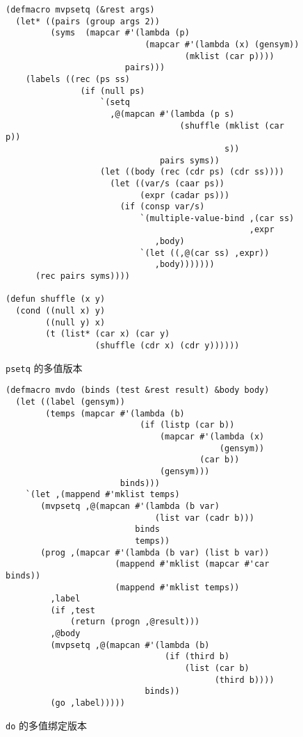 \begin{figure}
\begin{lstlisting}
(defmacro mvpsetq (&rest args)
  (let* ((pairs (group args 2))
         (syms  (mapcar #'(lambda (p)
                            (mapcar #'(lambda (x) (gensym))
                                    (mklist (car p))))
                        pairs)))
    (labels ((rec (ps ss)
               (if (null ps)
                   `(setq
                     ,@(mapcan #'(lambda (p s)
                                   (shuffle (mklist (car p))
                                            s))
                               pairs syms))
                   (let ((body (rec (cdr ps) (cdr ss))))
                     (let ((var/s (caar ps))
                           (expr (cadar ps)))
                       (if (consp var/s)
                           `(multiple-value-bind ,(car ss)
                                                 ,expr
                              ,body)
                           `(let ((,@(car ss) ,expr))
                              ,body)))))))
      (rec pairs syms))))

(defun shuffle (x y)
  (cond ((null x) y)
        ((null y) x)
        (t (list* (car x) (car y)
                  (shuffle (cdr x) (cdr y))))))
\end{lstlisting}
  \caption{\texttt{psetq} 的多值版本}
  \label{fig:multiple_value_version_of_psetq}
\end{figure}

\begin{figure}
\begin{lstlisting}
(defmacro mvdo (binds (test &rest result) &body body)
  (let ((label (gensym))
        (temps (mapcar #'(lambda (b)
                           (if (listp (car b))
                               (mapcar #'(lambda (x)
                                           (gensym))
                                       (car b))
                               (gensym)))
                       binds)))
    `(let ,(mappend #'mklist temps)
       (mvpsetq ,@(mapcan #'(lambda (b var)
                              (list var (cadr b)))
                          binds
                          temps))
       (prog ,(mapcar #'(lambda (b var) (list b var))
                      (mappend #'mklist (mapcar #'car binds))
                      (mappend #'mklist temps))
         ,label
         (if ,test
             (return (progn ,@result)))
         ,@body
         (mvpsetq ,@(mapcan #'(lambda (b)
                                (if (third b)
                                    (list (car b)
                                          (third b))))
                            binds))
         (go ,label)))))
\end{lstlisting}
  \caption{\texttt{do} 的多值绑定版本}
  \label{fig:multiple_value_binding_version_of_do}
\end{figure}

